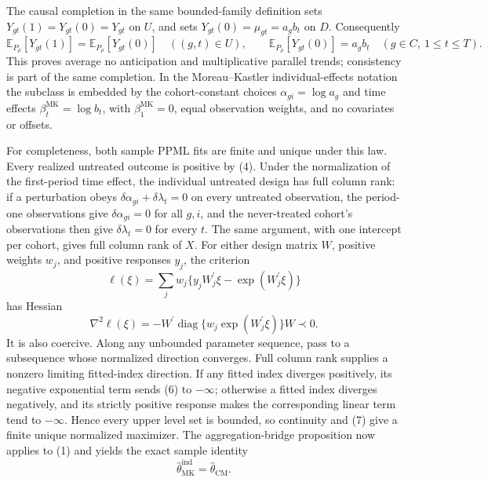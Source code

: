 The causal completion in the same bounded-family definition sets \(Y_{gt}(1)=Y_{gt}(0)=Y_{gt}\) on \(U\), and sets \(Y_{gt}(0)=\mu_{gt}=a_gb_t\) on \(D\).  Consequently
\[
\mathbb E_{P_\rho}[Y_{gt}(1)]
=\mathbb E_{P_\rho}[Y_{gt}(0)]
\quad((g,t)\in U),
\qquad
\mathbb E_{P_\rho}[Y_{gt}(0)]=a_gb_t
\quad(g\in C,\ 1\le t\le T).
\tag{5}
\]
This proves average no anticipation and multiplicative parallel trends; consistency is part of the same completion.  In the Moreau--Kastler individual-effects notation the subclass is embedded by the cohort-constant choices \(\alpha_{gi}=\log a_g\) and time effects \(\beta_t^{\mathrm{MK}}=\log b_t\), with \(\beta_1^{\mathrm{MK}}=0\), equal observation weights, and no covariates or offsets.

For completeness, both sample PPML fits are finite and unique under this law.  Every realized untreated outcome is positive by (4).  Under the normalization of the first-period time effect, the individual untreated design has full column rank: if a perturbation obeys \(\delta\alpha_{gi}+\delta\lambda_t=0\) on every untreated observation, the period-one observations give \(\delta\alpha_{gi}=0\) for all \(g,i\), and the never-treated cohort's observations then give \(\delta\lambda_t=0\) for every \(t\).  The same argument, with one intercept per cohort, gives full column rank of \(X\).  For either design matrix \(W\), positive weights \(w_j\), and positive responses \(y_j\), the criterion
\[
\ell(\xi)=\sum_jw_j\{y_jW_j^{\prime}\xi-
\exp(W_j^{\prime}\xi)\}
\tag{6}
\]
has Hessian
\[
\nabla^2\ell(\xi)
=-W^{\prime}\operatorname{diag}
\{w_j\exp(W_j^{\prime}\xi)\}W\prec0.
\tag{7}
\]
It is also coercive.  Along any unbounded parameter sequence, pass to a subsequence whose normalized direction converges.  Full column rank supplies a nonzero limiting fitted-index direction.  If any fitted index diverges positively, its negative exponential term sends (6) to \(-\infty\); otherwise a fitted index diverges negatively, and its strictly positive response makes the corresponding linear term tend to \(-\infty\).  Hence every upper level set is bounded, so continuity and (7) give a finite unique normalized maximizer.  The aggregation-bridge proposition now applies to (1) and yields the exact sample identity
\[
\widehat\theta_{\mathrm{MK}}^{\mathrm{ind}}
=\widehat\theta_{\mathrm{CM}}.
\tag{8}
\]

